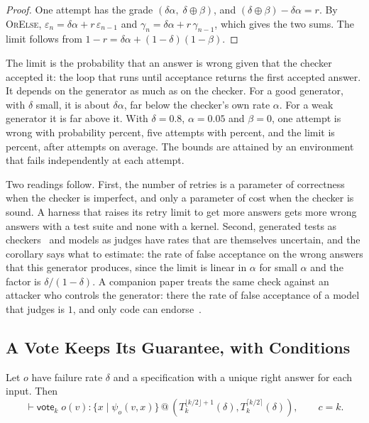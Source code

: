 \documentclass[acmsmall,nonacm,screen]{acmart}
\makeatletter
\newcommand{\kw}[1]{\mathsf{#1}}
\newcommand{\vote}[2]{\kw{vote}_{#1}\;#2}
\newcommand{\rty}[2]{\{#1 \mid #2\}}
\newcommand{\at}[2]{\mathrel{@}(#1, #2)}
\newcommand{\tl}[3]{T_{#1}^{#2}(#3)}
\makeatother
\begin{document}
\begin{proof}
One attempt has the grade $(\delta\alpha,\; \delta \oplus \beta)$, and
$(\delta \oplus \beta) - \delta\alpha = r$. By \textsc{OrElse},
$\varepsilon_n = \delta\alpha + r\,\varepsilon_{n-1}$ and
$\gamma_n = \delta\alpha + r\,\gamma_{n-1}$, which gives the two sums. The limit follows from
$1 - r = \delta\alpha + (1 - \delta)(1 - \beta)$.
\end{proof}

The limit is the probability that an answer is wrong given that the checker accepted it: the
loop that runs until acceptance returns the first accepted answer. It depends on the
generator as much as on the checker. For a good generator, with $\delta$ small, it is about
$\delta\alpha$, far below the checker's own rate $\alpha$. For a weak generator it is far
above it. With $\delta = 0.8$, $\alpha = 0.05$ and $\beta = 0$, one attempt is wrong with
probability \exPatchOne{} percent, five attempts with \exPatchFive{} percent, and the limit is
\exPatchLimit{} percent, after \exPatchCalls{} attempts on average. The bounds are attained
by an environment that fails independently at each attempt.

Two readings follow. First, the number of retries is a parameter of correctness when the
checker is imperfect, and only a parameter of cost when the checker is sound. A harness that
raises its retry limit to get more answers gets more wrong answers with a test suite and none
with a kernel. Second, generated tests as checkers~\citep{chen2022} and models as judges have
rates that are themselves uncertain, and the corollary says what to estimate: the rate of
false acceptance on the wrong answers that this generator produces, since the limit is linear
in $\alpha$ for small $\alpha$ and the factor is $\delta/(1 - \delta)$. A companion paper
treats the same check against an attacker who controls the generator: there the rate of false
acceptance of a model that judges is $1$, and only code can endorse~\citep{tpp7}.

\subsection{A Vote Keeps Its Guarantee, with Conditions}
\label{sec:votes}

\begin{corollary}
\label{cor:vote}
Let $o$ have failure rate $\delta$ and a specification with a unique right answer for each
input. Then
\[
\vdash \vote{k}{o(v)} : \rty{x}{\psi_o(v, x)}
  \at{\tl{k}{\lfloor k/2 \rfloor + 1}{\delta}}{\tl{k}{\lceil k/2 \rceil}{\delta}},
\qquad c = k .
\]
\end{corollary}
\end{document}

